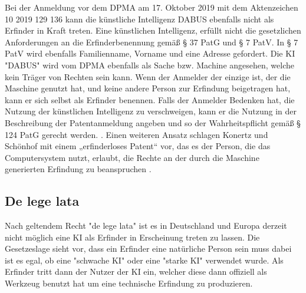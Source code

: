 Bei der Anmeldung vor dem DPMA am 17. Oktober 2019 mit dem Aktenzeichen
10 2019 129 136 kann die künstliche Intelligenz 
DABUS ebenfalls nicht als Erfinder in Kraft treten. 
Eine künstlichen Intelligenz, 
erfüllt nicht die gesetzlichen Anforderungen an die Erfinderbenennung 
gemäß § 37 PatG und § 7 PatV. In § 7 PatV wird ebenfalls
Familienname, Vorname und eine Adresse gefordert. 
Die KI "DABUS" wird vom DPMA ebenfalls als 
Sache bzw. Machine angesehen, welche kein Träger von Rechten sein kann.
Wenn der Anmelder der einzige ist, 
der die Maschine genutzt hat, 
und keine andere Person zur Erfindung beigetragen hat, 
kann er sich selbst als Erfinder benennen. 
Falls der Anmelder Bedenken hat, 
die Nutzung der künstlichen Intelligenz zu verschweigen, 
kann er die Nutzung in der Beschreibung der Patentanmeldung angeben 
und so der Wahrheitspflicht gemäß § 124 PatG gerecht werden.
\cite{BPatG21122021}.
Einen weiteren Ansatz schlagen Konertz und Schönhof mit einem 
„erfinderloses Patent“ vor, das es der Person, 
die das Computersystem nutzt, erlaubt, 
die Rechte an der durch die Maschine generierten Erfindung zu beanspruchen
\cite{konertzErfindungenDurchComputer2018}.

\subsection{De lege lata}
Nach geltendem Recht "de lege lata" ist es in Deutschland und Europa
derzeit nicht möglich eine KI als Erfinder in Erscheinung treten zu lassen.
Die Gesetzeslage sieht vor, dass ein Erfinder eine natürliche Person sein muss
dabei ist es egal, ob eine "schwache KI" oder eine "starke KI" verwendet wurde.
Als Erfinder tritt dann der Nutzer der KI ein, welcher diese dann offiziell
als Werkzeug benutzt hat um eine technische Erfindung zu produzieren.

